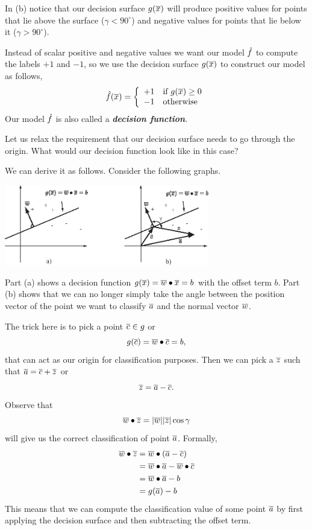 \documentclass[a4paper,blends,pdf,colorBG,slideColor]{prosper}
\begin{document}
In (b) notice that our decision surface $g(\overline{x})$ will produce 
positive values for points that lie above the surface ($\gamma < 90^\circ$) 
 and negative values for points that lie below it ($\gamma > 90^\circ$).  
\es

Instead of
scalar positive and negative values we want our model $\hat{f}$ to compute the labels
$+1$ and $-1$, so we use the decision surface $g(\overline{x})$ to construct our model as follows,
\[
\hat{f}(\overline{x}) = \left\{
\begin{array}{ll}
+1 & \mbox{if $g(\overline{x}) \ge 0$}\\
-1 & \mbox{otherwise}
\end{array}
\right.
\]
Our model $\hat{f}$ is also called a {\bf\em decision function}.

\es

Let us relax the requirement that our decision surface needs to go through the origin.  What would
our decision function look like in this case?

We can derive it as follows.  Consider the following graphs.
\begin{center}
\includegraphics[height=35mm]{figures/fig04-02.eps}
\end{center}
Part (a) shows a decision function $g(\overline{x}) = \overline{w}\bullet\overline{x} = b$ with the offset term $b$.
Part (b) shows that we can no longer simply take the angle between the position vector of the point we
want to classify $\overline{a}$ and the normal vector $\overline{w}$.
\es

The trick here is to pick a point $\overline{c} \in g$ or
\begin{equation*}
g(\overline{c}) = \overline{w}\bullet\overline{c} = b,
\end{equation*}
that can act as our origin for classification purposes.
Then we can pick a $\overline{z}$ such that $\overline{a} = \overline{c} + \overline{z}$ or
\begin{equation*}
\overline{z} = \overline{a} - \overline{c}.
\end{equation*}
Observe that
\begin{equation*}
\overline{w}\bullet\overline{z} = |{\overline{w}}||{\overline{z}}|\cos \gamma
\end{equation*}
will give us the correct classification of point $\overline{a}$.  Formally,
\begin{align*}
\overline{w}\bullet\overline{z} &= \overline{w}\bullet(\overline{a} - \overline{c}) \\
	&= \overline{w}\bullet\overline{a} - \overline{w}\bullet\overline{c} \\
	&= \overline{w}\bullet\overline{a} -b \\
	&= g(\overline{a}) - b
\end{align*}
This means that we can compute the classification value of some point $\overline{a}$ by first
applying the decision surface and then subtracting the offset term.
\es
\end{document}
